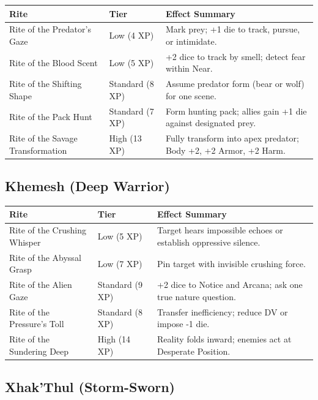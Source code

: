 \begin{longtable}{p{} p{} p{}}
\hline
\textbf{Rite} & \textbf{Tier} & \textbf{Effect Summary} \\
\hline
Rite of the Predator's Gaze & Low (4 XP) & Mark prey; +1 die to track, pursue, or intimidate. \\
Rite of the Blood Scent & Low (5 XP) & +2 dice to track by smell; detect fear within Near. \\
Rite of the Shifting Shape & Standard (8 XP) & Assume predator form (bear or wolf) for one scene. \\
Rite of the Pack Hunt & Standard (7 XP) & Form hunting pack; allies gain +1 die against designated prey. \\
Rite of the Savage Transformation & High (13 XP) & Fully transform into apex predator; Body +2, +2 Armor, +2 Harm. \\
\hline
\end{longtable}

\subsection{Khemesh (Deep Warrior)}

\begin{longtable}{p{} p{} p{}}
\hline
\textbf{Rite} & \textbf{Tier} & \textbf{Effect Summary} \\
\hline
Rite of the Crushing Whisper & Low (5 XP) & Target hears impossible echoes or establish oppressive silence. \\
Rite of the Abyssal Grasp & Low (7 XP) & Pin target with invisible crushing force. \\
Rite of the Alien Gaze & Standard (9 XP) & +2 dice to Notice and Arcana; ask one true nature question. \\
Rite of the Pressure's Toll & Standard (8 XP) & Transfer inefficiency; reduce DV or impose -1 die. \\
Rite of the Sundering Deep & High (14 XP) & Reality folds inward; enemies act at Desperate Position. \\
\hline
\end{longtable}

\subsection{Xhak'Thul (Storm-Sworn)}

